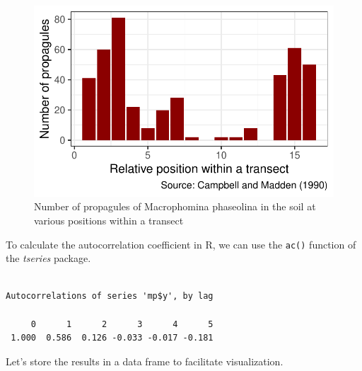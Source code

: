 \documentclass[
  letterpaper,
  DIV=11,
  numbers=noendperiod]{scrreprt}
\newenvironment{Shaded}{\begin{snugshade}}{\end{snugshade}}
\newcommand{\AttributeTok}[1]{\textcolor[rgb]{0.40,0.45,0.13}{#1}}
\newcommand{\ConstantTok}[1]{\textcolor[rgb]{0.56,0.35,0.01}{#1}}
\newcommand{\DecValTok}[1]{\textcolor[rgb]{0.68,0.00,0.00}{#1}}
\newcommand{\FunctionTok}[1]{\textcolor[rgb]{0.28,0.35,0.67}{#1}}
\newcommand{\NormalTok}[1]{\textcolor[rgb]{0.00,0.23,0.31}{#1}}
\newcommand{\OtherTok}[1]{\textcolor[rgb]{0.00,0.23,0.31}{#1}}
\newcommand{\SpecialCharTok}[1]{\textcolor[rgb]{0.37,0.37,0.37}{#1}}
\begin{document}
\begin{figure}[H]

{\centering \includegraphics{spatial-tests_files/figure-pdf/fig-macrophomina-1.pdf}

}

\caption{\label{fig-macrophomina}Number of propagules of Macrophomina
phaseolina in the soil at various positions within a transect}

\end{figure}

To calculate the autocorrelation coefficient in R, we can use the
\texttt{ac()} function of the \emph{tseries} package.

\begin{Shaded}
\end{Shaded}

\begin{verbatim}

Autocorrelations of series 'mp$y', by lag

     0      1      2      3      4      5 
 1.000  0.586  0.126 -0.033 -0.017 -0.181 
\end{verbatim}

Let's store the results in a data frame to facilitate visualization.

\begin{Shaded}
\end{Shaded}
\end{document}

